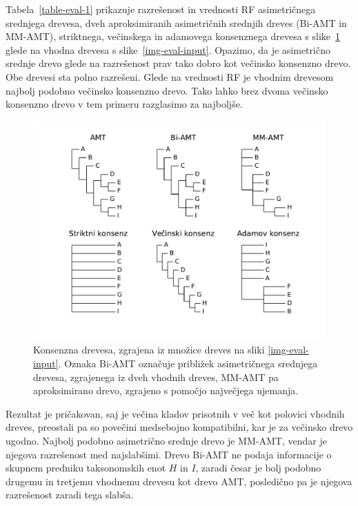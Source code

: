 \documentclass[a4paper, 12pt]{book}
\begin{document}
\noindent Tabela~\ref{table-eval-1} prikazuje razrešenost in vrednosti RF asimetričnega
srednjega drevesa, dveh aproksimiranih asimetričnih srednjih dreves 
(Bi-AMT in MM-AMT), striktnega, večinskega in adamovega konsenznega drevesa s 
slike~\ref{img-eval-result} glede na vhodna drevesa s slike~\ref{img-eval-input}. 
Opazimo, da je asimetrično srednje drevo glede na razrešenost prav tako dobro 
kot večinsko konsenzno drevo. Obe drevesi sta polno razrešeni. Glede na
vrednosti RF je vhodnim drevesom najbolj podobno večinsko konsenzno drevo. 
Tako lahko brez dvoma večinsko konsenzno drevo v tem primeru razglasimo za 
najboljše.

\begin{figure}[h!]
	\begin{center}
		\includegraphics[scale=0.55, clip=true, trim=1.5cm 1.5cm 1cm 0.8cm]{gfx/eval_gfx.pdf}
	\end{center}
	\caption{
	         Konsenzna drevesa, zgrajena iz množice dreves na sliki \ref{img-eval-input}. Oznaka Bi-AMT označuje 
	         približek asimetričnega srednjega drevesa, zgrajenega iz dveh vhodnih dreves, MM-AMT pa aproksimirano 
	         drevo, zgrajeno s pomočjo največjega ujemanja.
	    }
	\label{img-eval-result}
\end{figure}

Rezultat je pričakovan, saj je večina kladov prisotnih v več kot polovici vhodnih 
dreves, preostali pa so povečini medsebojno kompatibilni, kar je za večinsko drevo
ugodno. Najbolj podobno asimetrično srednje drevo je MM-AMT, vendar je njegova 
razrešenost med najslabšimi. Drevo Bi-AMT ne podaja informacije o skupnem predniku 
taksonomskih enot $H$ in $I$, zaradi česar je bolj podobno drugemu in tretjemu 
vhodnemu drevesu kot drevo AMT, posledično pa je njegova razrešenost zaradi tega slabša. 
\end{document}
